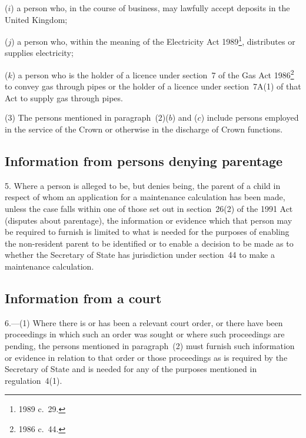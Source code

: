 \documentclass[12pt,a4paper]{article}
\begin{document}
\begin{enumerate}
($i$) a person who, in the course of business, may lawfully accept deposits in the United Kingdom;

($j$) a person who, within the meaning of the Electricity Act 1989\footnote{1989 c.~29.}, distributes or supplies electricity;

($k$) a person who is the holder of a licence under section~7 of the Gas Act 1986\footnote{1986 c.~44.} to convey gas through pipes or the holder of a licence under section~7A(1) of that Act to supply gas through pipes.
\end{enumerate}

(3) The persons mentioned in paragraph~(2)($b$)  and ($c$)  include persons employed in the service of the Crown or otherwise in the discharge of Crown functions.


\subsection[5. Information from persons denying parentage]{Information from persons denying parentage}

5.  Where a person is alleged to be, but denies being, the parent of a child in respect of whom an application for a maintenance calculation has been made, unless the case falls within one of those set out in section~26(2) of the 1991 Act (disputes about parentage), the information or evidence which that person may be required to furnish is limited to what is needed for the purposes of enabling the non-resident parent to be identified or to enable a decision to be made as to whether the 
Secretary of State  %
has jurisdiction under section~44 to make a maintenance calculation.


\subsection[6. Information from a court]{Information from a court}

6.---(1)  Where there is or has been a relevant court order, or there have been proceedings in which such an order was sought or where such proceedings are pending, the persons mentioned in paragraph~(2) must furnish such information or evidence in relation to that order or those proceedings as is required by the 
Secretary of State  %
and is needed for any of the purposes mentioned in regulation~4(1).
\end{document}
